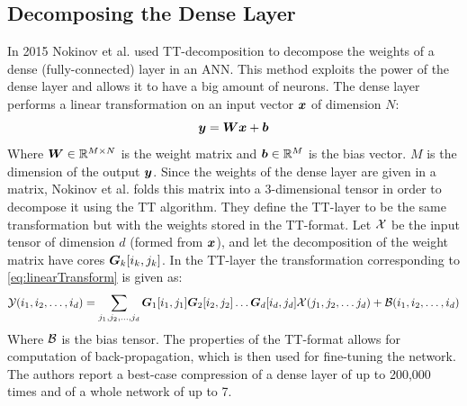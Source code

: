 \subsection{Decomposing the Dense Layer}
In 2015 Nokinov et al. used TT-decomposition to decompose the weights of a dense (fully-connected) layer in an ANN\cite{Novikov2015}. This method exploits the power of the dense layer and allows it to have a big amount of neurons. The dense layer performs a linear transformation on an input vector $\boldsymbol{x}$ of dimension $N$:
\begin{equation}
    \boldsymbol{y} = \boldsymbol{W} \boldsymbol{x} + \boldsymbol{b}
    \label{eq:linearTransform}
\end{equation}
Where $\boldsymbol{W} \in \mathbb{R}^{M\times N}$ is the weight matrix and $\boldsymbol{b} \in \mathbb{R}^{M}$ is the bias vector. $M$ is the dimension of the output $\boldsymbol{y}$. Since the weights of the dense layer are given in a matrix, Nokinov et al. folds this matrix into a 3-dimensional tensor in order to decompose it using the TT algorithm. They define the TT-layer to be the same transformation but with the weights stored in the TT-format. Let $\mathcal{X}$ be the input tensor of dimension $d$ (formed from $\boldsymbol{x}$), and let the decomposition of the weight matrix have cores $\boldsymbol{G}_k[i_k, j_k]$. In the TT-layer the transformation corresponding to \eqref{eq:linearTransform} is given as:
\begin{equation}
    \mathcal{Y}(i_1, i_2, \dots, i_d) = \sum_{j_1, j_2, \dots, j_d} \boldsymbol{G}_1[i_1, j_1] \boldsymbol{G}_2[i_2, j_2]\dots \boldsymbol{G}_d[i_d, j_d] \mathcal{X}(j_1, j_2, \dots j_d) + \mathcal{B}(i_1, i_2, \dots, i_d)
\end{equation}
Where $\mathcal{B}$ is the bias tensor. The properties of the TT-format allows for computation of back-propagation, which is then used for fine-tuning the network. The authors report a best-case compression of a dense layer of up to 200,000 times and of a whole network of up to 7.

